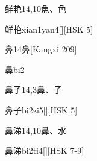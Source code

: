 \begin{Entry}{鲜艳}{14,10}{⿂、⾊}
  \begin{Phonetics}{鲜艳}{xian1yan4}[][HSK 5]
  \end{Phonetics}
\end{Entry}

\begin{Entry}{鼻}{14}{⿐}[Kangxi 209]
  \begin{Phonetics}{鼻}{bi2}
  \end{Phonetics}
\end{Entry}

\begin{Entry}{鼻子}{14,3}{⿐、⼦}
  \begin{Phonetics}{鼻子}{bi2zi5}[][HSK 5]
  \end{Phonetics}
\end{Entry}

\begin{Entry}{鼻涕}{14,10}{⿐、⽔}
  \begin{Phonetics}{鼻涕}{bi2ti4}[][HSK 7-9]
  \end{Phonetics}
\end{Entry}



